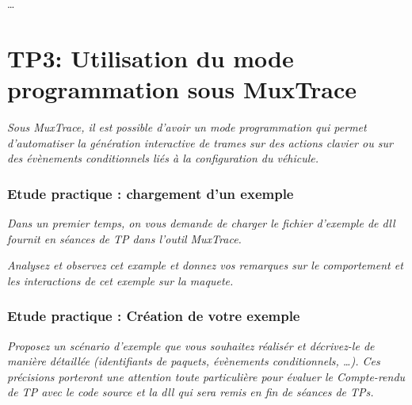 \documentclass{rapportECC}
\begin{document}
\dots



\section{TP3: Utilisation du mode programmation sous MuxTrace}

\textit{Sous MuxTrace, il est possible d'avoir un mode programmation qui permet d'automatiser la génération interactive de trames sur des actions clavier ou sur des évènements conditionnels liés à la configuration du véhicule.}


\subsubsection*{Etude practique : chargement d'un exemple}

\textit{Dans un premier temps, on vous demande de charger le fichier d'exemple de dll fournit en séances de TP dans l'outil MuxTrace.}

\textit{Analysez et observez cet example et donnez vos remarques sur le comportement et les interactions de cet exemple sur la maquete.}


\subsubsection*{Etude practique : Création de votre exemple}

\textit{Proposez un scénario d'exemple que vous souhaitez réalisér et décrivez-le de manière détaillée (identifiants de paquets, évènements conditionnels, \dots). Ces précisions porteront une attention toute particulière pour évaluer le Compte-rendu de TP avec le code source et la dll qui sera remis en fin de séances de TPs.}
\end{document}
